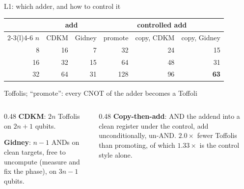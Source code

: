 \documentclass[aspectratio=169,11pt]{beamer}
\begin{document}
\begin{frame}{L1: which adder, and how to control it}
  \centering\footnotesize
  \renewcommand{\arraystretch}{1.12}
  \begin{tabular}{@{}rrrrrr@{}}
    \toprule
    & \multicolumn{2}{c}{add} & \multicolumn{3}{c}{controlled add} \\
    \cmidrule(lr){2-3}\cmidrule(l){4-6}
    $n$ & CDKM & Gidney & promote & copy, CDKM & copy, Gidney \\
    \midrule
    8 & 16 & 7 & 32 & 24 & 15 \\
    16 & 32 & 15 & 64 & 48 & 31 \\
    32 & 64 & 31 & 128 & 96 & \textbf{63} \\
    \bottomrule
  \end{tabular}\par
  {\scriptsize Toffolis; ``promote'': every CNOT of the adder becomes a Toffoli}\par
  \vskip3mm
  \raggedright
  \begin{columns}[T]
    \begin{column}{0.48\textwidth}
      \small \textbf{CDKM}: $2n$ Toffolis on $2n+1$ qubits.\par\vskip1mm
      \textbf{Gidney}: $n-1$ ANDs on clean targets, free to uncompute (measure and fix the phase), on $3n-1$ qubits.
    \end{column}
    \begin{column}{0.48\textwidth}
      \small \textbf{Copy-then-add}: AND the addend into a clean register under the control, add unconditionally, un-AND. $2.0\times$ fewer Toffolis than promoting, of which $1.33\times$ is the control style alone.
    \end{column}
  \end{columns}
\end{frame}
\end{document}
